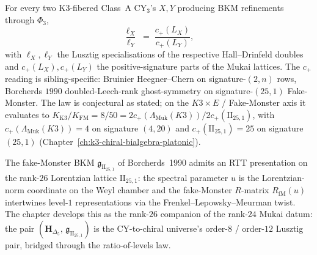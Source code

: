 \begin{remark}
\label{rem:psi-ratio-of-levels}
For every two K3-fibered Class~A CY$_3$'s $X, Y$ producing BKM refinements
through $\Phi_3$,
\[
 \frac{\ell_X}{\ell_Y}
 \;=\;
 \frac{c_+(L_X)}{c_+(L_Y)},
\]
with $\ell_X, \ell_Y$ the Lusztig specialisations of the respective
Hall--Drinfeld doubles and $c_+(L_X), c_+(L_Y)$ the positive-signature
parts of the Mukai lattices. The $c_+$ reading is sibling-specific:
Bruinier Heegner--Chern on signature-$(2, n)$ rows, Borcherds $1990$
doubled-Leech-rank ghost-symmetry on signature-$(25, 1)$
Fake-Monster. The law is conjectural as stated; on the
$K3 \times E$ / Fake-Monster axis it evaluates to
$K_{\mathrm{K3}} / K_{\mathrm{FM}} = 8/50
= 2 c_+(\Lambda_{\mathrm{Muk}}(K3)) / 2 c_+(\mathrm{II}_{25,1})$,
with $c_+(\Lambda_{\mathrm{Muk}}(K3)) = 4$ on signature $(4, 20)$
and $c_+(\mathrm{II}_{25,1}) = 25$ on signature $(25, 1)$
(Chapter~\ref{ch:k3-chiral-bialgebra-platonic}).
\end{remark}

\begin{remark}
\label{rem:fake-monster-rtt}
The fake-Monster BKM $\mathfrak{g}_{\mathrm{II}_{25,1}}$ of
Borcherds~1990 admits an RTT presentation on the rank-$26$ Lorentzian
lattice $\mathrm{II}_{25,1}$: the spectral parameter $u$ is the
Lorentzian-norm coordinate on the Weyl chamber and the fake-Monster
$R$-matrix $R_{\mathrm{fM}}(u)$ intertwines level-$1$ representations
via the Frenkel--Lepowsky--Meurman twist. The chapter develops this
as the rank-$26$ companion of the rank-$24$ Mukai datum: the pair
$(\mathbf{H}_{\Delta_5},\,\mathfrak{g}_{\mathrm{II}_{25,1}})$ is the
CY-to-chiral universe's order-$8$ / order-$12$ Lusztig pair, bridged
through the ratio-of-levels law.
\end{remark}


